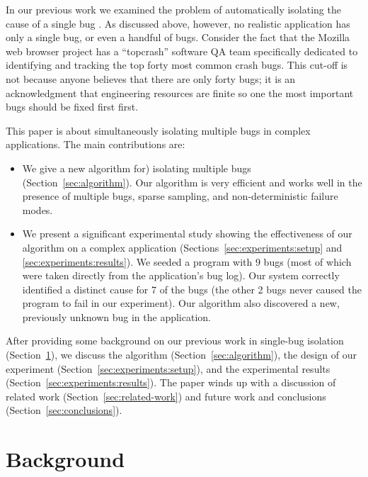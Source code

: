 \documentclass{sig-alternate}
\begin{document}
In our previous work we examined the problem of automatically
isolating the cause of a single bug
\cite{PLDI`03*141,Zheng:2003:SDSP}.  As discussed above, however, no
realistic application has only a single bug, or even a handful of
bugs.  Consider the fact that the Mozilla web browser project has a
``topcrash'' software QA team specifically dedicated to identifying
and tracking the top forty most common crash bugs.  This cut-off is
not because anyone believes that there are only forty bugs; it is an
acknowledgment that engineering resources are finite so one the most
important bugs should be fixed first first. 

This paper is about simultaneously isolating multiple bugs in complex
applications.  The main contributions are:

\begin{itemize}

\item We give a new algorithm for) isolating multiple bugs
(Section~\ref{sec:algorithm}).  Our algorithm is very efficient and works well in the
presence of multiple bugs, sparse sampling, and non-deterministic failure
modes.

\item We present a significant experimental study showing the
effectiveness of our algorithm on a complex application
(Sections~\ref{sec:experiments:setup} and
\ref{sec:experiments:results}).  We seeded a program with 9 bugs (most
of which were taken directly from the application's bug log).  Our
system correctly identified a distinct cause for 7 of the bugs (the
other 2 bugs never caused the program to fail in our experiment).  
Our algorithm also discovered a new, previously unknown bug in the
application.

\end{itemize}

After providing some background on our previous work in single-bug
isolation (Section~\ref{sec:background}), we discuss the algorithm (Section~\ref{sec:algorithm}),
the design of our experiment (Section~\ref{sec:experiments:setup}), and
the experimental results (Section~\ref{sec:experiments:results}).
The paper winds up with a discussion of related work (Section~\ref{sec:related-work})
and future work and conclusions (Section~\ref{sec:conclusions}).

\section{Background}
\label{sec:background}
\end{document}
